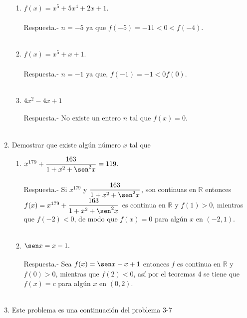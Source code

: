 \begin{enumerate}
\begin{enumerate}[\bfseries (i)]
	\item $f(x) = x^5+5x^4 + 2x + 1$.\\\\
	    Respuesta.-\; $n=-5$ ya que $f(-5) = -11<0<f(-4)$.\\\\

	\item $f(x) = x^5 + x + 1$.\\\\
	    Respuesta.-\; $n=-1$ ya que, $f(-1) = -1<0f(0)$.\\\\ 

	\item $4x^2-4x+1$\\\\
	    Respuesta.-\; No existe un entero $n$ tal que $f(x)=0$.\\\\

    \end{enumerate}

\item Demostrar que existe algún número $x$ tal que

    \begin{enumerate}[\bfseries (i)]

	\item $x^{179} + \dfrac{163}{1+x^2+\sen^2 x} = 119$.\\\\
	    Respuesta.-\; Si $x^{179}$  y  $\dfrac{163}{1+x^2+\sen^2 x}$, son continuas en $\mathbb{R}$ entonces $f(x) = x^{179}+\dfrac{163}{1+x^2+\sen^2 x}$ es continua en $\mathbb{R}$ y $f(1)>0$, mientras que $f(-2)<0$, de modo que $f(x)=0$ para algún $x$ en $(-2,1)$.\\\\

	\item $\sen x =x-1.$\\\\
	    Respuesta.-\; Sea $f(x) = \sen x - x + 1$ entonces $f$ es continua en $\mathbb{R}$ y $f(0)>0$, mientras que $f(2)<0$, así por el teoremas 4 se tiene que $f(x)=c$ para algún $x$ en $(0,2)$.\\\\

    \end{enumerate}

\item Este problema es una continuación del problema 3-7
    \begin{enumerate}[\bfseries (a)]


\end{enumerate}
\end{enumerate}
